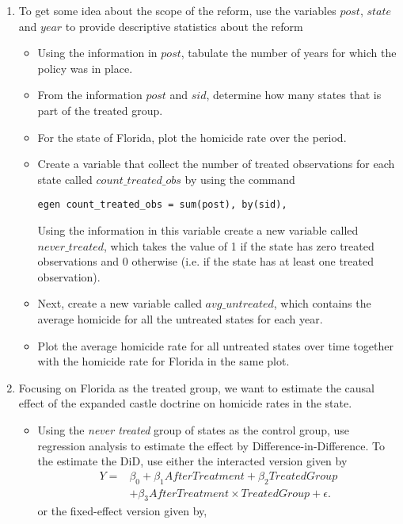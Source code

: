 \documentclass[12pt]{article}
\begin{document}
\begin{enumerate}
    \item To get some idea about the scope of the reform, use the variables $post$, $state$ and $year$ to provide descriptive statistics about the reform
    \begin{itemize}
        \item Using the information in $post$, tabulate the number of years for which the policy was in place. 
        \item From the information $post$ and $sid$, determine how many states that is part of the treated group.
        \item For the state of Florida, plot the homicide rate over the period.
        \item Create a variable that collect the number of treated observations for each state called $count\_treated\_obs$ by using the command 
\begin{verbatim}
egen count_treated_obs = sum(post), by(sid),
\end{verbatim}
        Using the information in this variable create a new variable called $never\_treated$, which takes the value of 1 if the state has zero treated observations and 0 otherwise (i.e. if the state has at least one treated observation).
        \item Next, create a new variable called $avg\_untreated$, which contains the average homicide for all the untreated states for each year.
        \item Plot the average homicide rate for all untreated states over time together with the homicide rate for Florida in the same plot.
    \end{itemize}  
    \item Focusing on Florida as the treated group, we want to estimate the causal effect of the expanded castle doctrine on homicide rates in the state. 
    \begin{itemize}
        \item Using the \emph{never treated} group of states as the control group, use regression analysis to estimate the effect by Difference-in-Difference. To the estimate the DiD, use either the interacted version given by
    \begin{align}
Y = &\beta_0 + \beta_1 AfterTreatment + \beta_2 TreatedGroup\\ \nonumber
&+ \beta_3 AfterTreatment \times TreatedGroup + \epsilon.
\end{align}
or the fixed-effect version given by,
\begin{equation}

\end{equation}
\end{itemize}
\end{enumerate}
\end{document}
